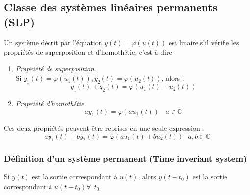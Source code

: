 	\subsection{Classe des systèmes linéaires permanents (SLP)}
	Un système décrit par l'équation $y(t) = \varphi(u(t))$ est linaire s'il 
	vérifie les propriétés de superposition et d’homothétie, c'est-à-dire :
	\begin{enumerate}
	\item \textit{Propriété de superposition}.\\
	Si $y_1(t) = \varphi(u_1(t)), y_2(t) = \varphi(u_2(t))$, alors :
	\begin{equation}
	y_1(t)+y_2(t) = \varphi(u_1(t) + u_2(t))
	\end{equation}
	\item \textit{Propriété d’homothétie}.\\
	\begin{equation}
	ay_1(t) = \varphi(au_1(t))\ \ \ \ a \in \mathbb{C}
	\end{equation}
	\end{enumerate}	
	Ces deux propriétés peuvent être reprises en une seule expression :
	\begin{equation}
	ay_1(t) + by_2(t) = \varphi(au_1(t) + bu_2(t))\ \ \ a,b\in\mathbb{C}
	\end{equation}		
	
	
		\subsubsection{Définition d'un système permanent (Time inveriant 
		system)}
		Si $y(t)$ est la sortie correspondant à $u(t)$, alors $y(t-t_0)$ 
		est la sortie correspondant à $u(t-t_0) \forall\ \ t_0$.
		
	
	
	
	
	
	
	
	
	
	
	